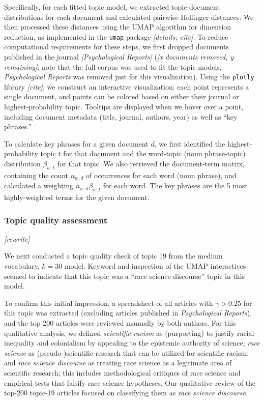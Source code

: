 \documentclass[12pt]{article}
\begin{document}
Specifically, for each fitted topic model, we extracted topic-document distributions for each document and calculated pairwise Hellinger distances. We then processed these distances using the UMAP algorithm for dimension reduction, as implemented in the \texttt{umap} package \emph{{[}details; cite{]}}. To reduce computational requirements for these steps, we first dropped documents published in the journal \emph{{[}Psychological Reports{]}} (\emph{{[}x documents removed, y remaining{]}}; note that the full corpus was used to fit the topic models, \emph{Psychological Reports} was removed just for this visualization). Using the \texttt{plotly} library \emph{{[}cite{]}}, we construct an interactive visualization: each point represents a single document, and points can be colored based on either their journal or highest-probability topic. Tooltips are displayed when we hover over a point, including document metadata (title, journal, authors, year) as well as ``key phrases.''

To calculate key phrases for a given document \(d\), we first identified the highest-probability topic \(t\) for that document and the word-topic (noun phrase-topic) distribution \(\beta_{w,t}\) for that topic. We also retrieved the document-term matrix, containing the count \(n_{w,d}\) of occurrences for each word (noun phrase), and calculated a weighting \(n_{w,d} \beta_{w,t}\) for each word. The key phrases are the 5 most highly-weighted terms for the given document.

\hypertarget{topic-quality-assessment}{%
\subsubsection*{Topic quality assessment}\label{topic-quality-assessment}}

\emph{{[}rewrite{]}}

We next conducted a topic quality check of topic 19 from the medium vocabulary, \(k=30\) model. Keyword and inspection of the UMAP interactives seemed to indicate that this topic was a ``race science discourse'' topic in this model.

To confirm this initial impression, a spreadsheet of all articles with \(\gamma > 0.25\) for this topic was extracted (excluding articles published in \emph{Psychological Reports}), and the top 200 articles were reviewed manually by both authors. For this qualitative analysis, we defined \emph{scientific racism} as (purporting) to justify racial inequality and colonialism by appealing to the epistemic authority of science; \emph{race science} as (pseudo-)scientific research that can be utilized for scientific racism; and \emph{race science discourse} as treating race science as a legitimate area of scientific research; this includes methodological critiques of race science and empirical tests that falsify race science hypotheses. Our qualitative review of the top-200 topic-19 articles focused on classifying them as \emph{race science discourse}.
\end{document}
